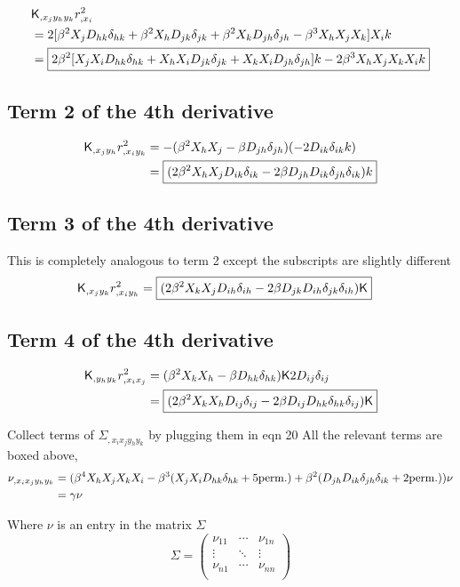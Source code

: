 \begin{align*}
&\mathsf{K}_{,x_j y_h y_k} r_{,x_i}^2\\
&= 2[\beta^2 X_j D_{hk} \delta_{hk} + \beta^2 X_h D_{jk}\delta_{jk} +
\beta^2 X_k D_{jh} \delta_{jh} - \beta^3 X_h X_j X_k] X_i k\\ 
&=\boxed{2\beta^2[ 
X_j X_i D_{hk} \delta_{hk} + 
X_h X_i D_{jk} \delta_{jk} + 
X_k X_i D_{jh} \delta_{jh}] k  
- 2\beta^3 X_h X_j X_k X_i k} 
\end{align*}

\subsection{Term 2 of the 4th derivative}
\begin{align*}
\mathsf{K}_{,x_j y_h} r^2_{,x_i y_k}
&= - (\beta^2 X_h X_j - \beta D_{jh} \delta_{jh}) (-2D_{ik} \delta_{ik}k) \\  
&= \boxed{( 2 \beta^2  X_h X_j D_{ik} \delta_{ik} 
-2 \beta D_{jh} D_{ik} \delta_{jh} \delta_{ik}) k} 
\end{align*}

\subsection{Term 3 of the 4th derivative}
This is completely analogous to term 2 except the subscripts are slightly
different
\begin{align*}
\mathsf{K}_{,x_j y_k} r^2_{,x_i y_h}
&=\boxed { ( 2 \beta^2  X_k X_j D_{ih} \delta_{ih} 
-2 \beta D_{jk} D_{ih} \delta_{jk} \delta_{ih}) \mathsf{K}} 
\end{align*}

\subsection{Term 4 of the 4th derivative} 
\begin{align*}
\mathsf{K}_{,y_h y_k} r^2_{,x_i x_j}
&= (\beta^2 X_k X_h - \beta D_{hk}\delta_{hk})\mathsf{K} 2 D_{ij} \delta_{ij}\\ 
&= \boxed{(2\beta^2 X_k X_h D_{ij} \delta_{ij} - 2\beta D_{ij} D_{hk} \delta_{hk}
\delta_{ij})\mathsf{K} } 
\end{align*}

Collect terms of $\Sigma_{,x_i x_j y_h y_k}$ by plugging them in eqn 20 
All the relevant terms are boxed above, 
\begin{align}
\nu_{,x_i x_j y_h y_k} &= (\beta^4 X_h X_j X_k X_i -  
\beta^3 (X_j X_i D_{hk} \delta_{hk} + 5 {\rm perm.}) + \beta^2
(D_{jh} D_{ik}\delta_{jh}\delta_{ik} + 2 {\rm perm.})) \nu \\
&= \gamma \nu
\end{align}

Where $\nu$ is an entry in the matrix $\Sigma$
\begin{equation}
\Sigma  = 
\left(
\begin{array}{ccc}
\nu_{11} & \cdots & \nu_{1n} \\
\vdots & \ddots & \vdots \\
\nu_{n1} & \cdots & \nu_{nn} \\
\end{array}
\right)
\end{equation}


